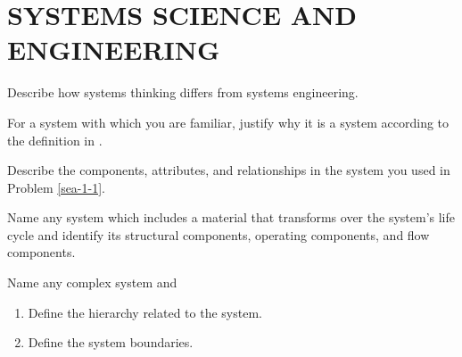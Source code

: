 \chapter{SYSTEMS SCIENCE AND ENGINEERING}

\begin{exercises}
    \begin{exercise}
    \label{sea-1-26}
        Describe how systems thinking differs from systems engineering.
    \end{exercise}
    \begin{solution}
    \end{solution}
    
    \begin{exercise}
    \label{sea-1-1}
        For a system with which you are familiar, justify why it is a system according to the definition in .
    \end{exercise}
    \begin{solution}
    \end{solution}
    
    \begin{exercise} 
    \label{sea-1-2}
        Describe the components, attributes, and relationships in the system you used in Problem \ref{sea-1-1}.
    \end{exercise}
    \begin{solution}
    \end{solution}
    
    \begin{exercise}
    \label{sea-1-3}
        Name any system which includes a material that transforms over the system's life cycle and identify its structural components, operating components, and flow components.
    \end{exercise}
    \begin{solution}
    \end{solution}
    
    \begin{exercise} 
    \label{sea-1-4_5}
        Name any complex system and
        \begin{enumerate}[label=\alph*)]
            \item Define the hierarchy related to the system.
            \item Define the system boundaries.
        \end{enumerate}
    \end{exercise}
    \begin{solution}
    \end{solution}
    

\end{exercises}
